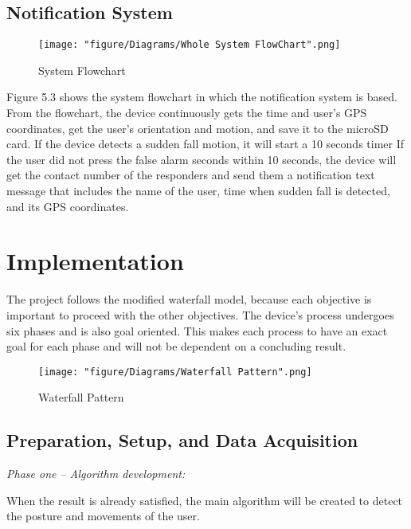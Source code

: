 \subsection{Notification System}

\begin{figure}[htbp]
	\centering
		\texttt{[image: "figure/Diagrams/Whole System FlowChart".png]}
	\caption{System Flowchart}
	\label{fig:Whole System FlowChart}
\end{figure}

Figure 5.3 shows the system flowchart in which the notification system is based. From the flowchart, the device continuously gets the time and user’s GPS coordinates, get the user’s orientation and motion, and save it to the microSD card. If the device detects a sudden fall motion, it will start a 10 seconds timer \cite{Kaz14} %
If the user did not press the false alarm seconds within 10 seconds, the device will get the contact number of the responders and send them a notification text message that includes the name of the user, time when sudden fall is detected, and its GPS coordinates.

\section{Implementation}
\label{sec:implement}

The project follows the modified waterfall model, because each objective is important to proceed with the other objectives. The device’s process undergoes six phases and is also goal oriented. This makes each process to have an exact goal for each phase and will not be dependent on a concluding result.

\begin{figure}[htbp]
	\centering
		\texttt{[image: "figure/Diagrams/Waterfall Pattern".png]}
	\caption{Waterfall Pattern}
	\label{fig:Waterfall Pattern}
\end{figure}

\subsection{Preparation, Setup, and Data Acquisition}

\noindent \textit{Phase one – Algorithm development:}

When the result is already satisfied, the main algorithm will be created to detect the posture and movements of the user.

